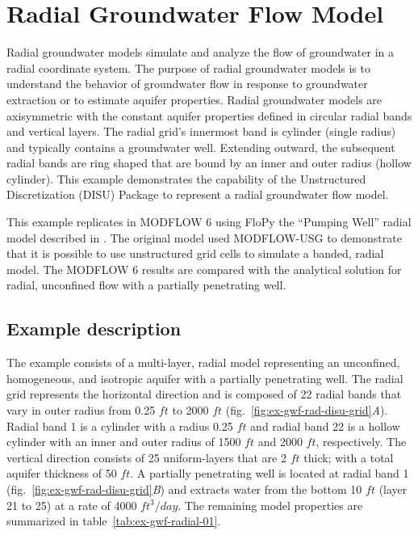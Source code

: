 \section{Radial Groundwater Flow Model}
Radial groundwater models simulate and analyze the flow of groundwater in a radial coordinate system. The purpose of radial groundwater models is to understand the behavior of groundwater flow in response to groundwater extraction or to estimate aquifer properties. Radial groundwater models are axisymmetric with the constant aquifer properties defined in circular radial bands and vertical layers. The radial grid’s innermost band is cylinder (single radius) and typically contains a groundwater well. Extending outward, the subsequent radial bands are ring shaped that are bound by an inner and outer radius (hollow cylinder). This example demonstrates the capability of the Unstructured Discretization (DISU) Package to represent a radial groundwater flow model.

This example replicates in MODFLOW 6 using FloPy the ``Pumping Well'' radial model described in \cite{bedekar2019axisym}. The original model used MODFLOW-USG to demonstrate that it is possible to use unstructured grid cells to simulate a banded, radial model. The MODFLOW 6 results are compared with the \cite{neuman1974effect} analytical solution for radial, unconfined flow with a partially penetrating well.


\subsection{Example description}

The example consists of a multi-layer, radial model representing an unconfined, homogeneous, and isotropic aquifer with a partially penetrating well. The radial grid represents the horizontal direction and is composed of 22 radial bands that vary in outer radius from 0.25 $ft$ to 2000 $ft$ 
(fig.~\ref{fig:ex-gwf-rad-disu-grid}\textit{A}). Radial band 1 is a cylinder with a radius 0.25 $ft$ and radial band 22 is a hollow cylinder with an inner and outer radius of 1500 $ft$ and 2000 $ft$, respectively. The vertical direction consists of 25 uniform-layers that are 2 $ft$ thick; with a total aquifer thickness of 50 $ft$. A partially penetrating well is located at radial band 1 
(fig.~\ref{fig:ex-gwf-rad-disu-grid}\textit{B}) and extracts water from the bottom 10 $ft$ (layer 21 to 25) at a rate of 4000 $ft^3/day$. The remaining model properties are summarized in table~\ref{tab:ex-gwf-radial-01}.

